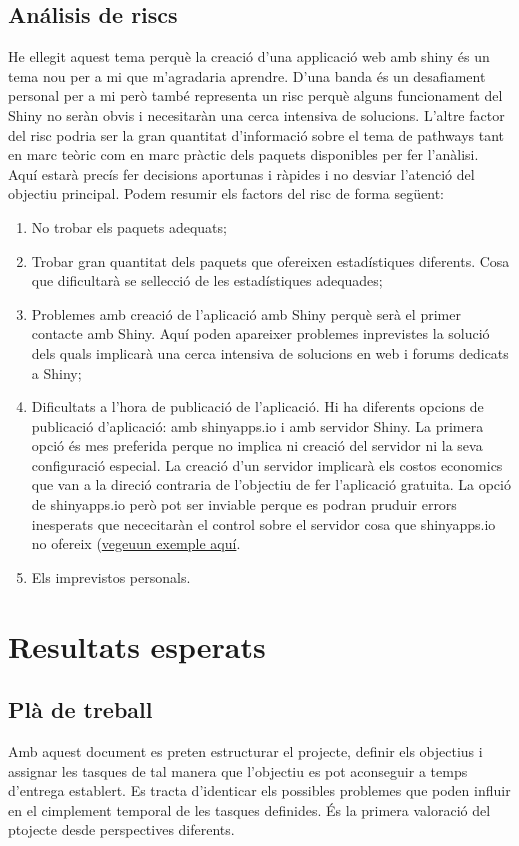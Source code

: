 \documentclass[]{article}
\begin{document}
\subsection{Análisis de riscs}
He ellegit aquest tema perquè la creació  d'una applicació web amb shiny és un tema nou per a mi que m'agradaria aprendre. D'una banda és un desafiament personal per a mi però també representa un risc perquè alguns funcionament del Shiny no seràn obvis i necesitaràn una cerca intensiva de solucions.  L'altre factor del risc podria ser la gran quantitat d'informació sobre el tema de pathways tant en marc teòric com en marc pràctic dels paquets disponibles per fer l'anàlisi. Aquí estarà precís fer decisions aportunas i ràpides i no desviar l'atenció del objectiu principal. Podem resumir els factors del risc de forma següent:
\begin{enumerate}
\item No trobar els paquets adequats;
\item Trobar gran quantitat dels paquets que ofereixen estadístiques diferents. Cosa que dificultarà se sellecció de les estadístiques adequades;
\item Problemes amb creació de l'aplicació amb Shiny perquè serà el primer contacte amb Shiny. Aquí poden apareixer problemes inprevistes la solució dels quals implicarà una cerca intensiva de solucions en web i forums dedicats a Shiny;
\item Dificultats a l'hora de publicació de l'aplicació.  Hi ha diferents opcions de publicació d'aplicació: amb shinyapps.io i amb servidor Shiny. La primera opció és mes preferida perque no implica ni creació del servidor ni la seva configuració especial. La creació d'un servidor implicarà els costos economics que van a la direció contraria de l'objectiu de fer l'aplicació gratuita.  La opció de shinyapps.io però pot ser inviable perque es podran pruduir errors inesperats  que nececitaràn el control sobre el servidor cosa que shinyapps.io no ofereix (\href{https://groups.google.com/forum/#!msg/shinyapps-users/QRydNubnMQA/kJBxwUIJCgAJ)}{vegeuun exemple aquí}. 
\item Els imprevistos personals.
\end{enumerate}

\section{Resultats esperats}
\subsection{Plà de treball}
Amb aquest document es preten estructurar el projecte,  definir els objectius i assignar les tasques de tal manera que l'objectiu es pot aconseguir a temps d'entrega establert. Es tracta d'identicar els possibles problemes que poden influir en el cimplement temporal de les tasques definides. És la primera valoració del ptojecte desde perspectives diferents.
\end{document}
